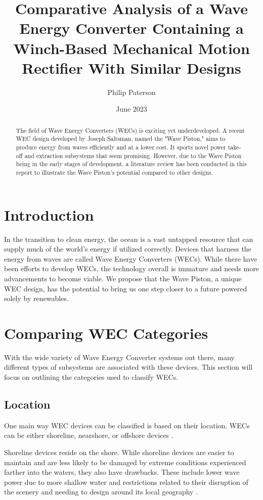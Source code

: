 \documentclass[journal]{IEEEtran}
\title{Comparative Analysis of a Wave Energy Converter Containing a Winch-Based Mechanical Motion Rectifier With Similar Designs}
\author{Philip Paterson}
\date{June 2023}
\begin{document}
\maketitle

\begin{abstract}
    The field of Wave Energy Converters (WECs) is exciting yet underdeveloped. A recent WEC design developed by Joseph Saltsman, named the "Wave Piston," aims to produce energy from waves efficiently and at a lower cost. It sports novel power take-off and extraction subsystems that seem promising. However, due to the Wave Piston being in the early stages of development, a literature review has been conducted in this report to illustrate the Wave Piston's potential compared to other designs.
\end{abstract}

\section{Introduction}
In the transition to clean energy, the ocean is a vast untapped resource that can supply much of the world's energy if utilized correctly. Devices that harness the energy from waves are called Wave Energy Converters (WECs). While there have been efforts to develop WECs, the technology overall is immature and needs more advancements to become viable. We propose that the Wave Piston, a unique WEC design, has the potential to bring us one step closer to a future powered solely by renewables.

\section{Comparing WEC Categories}
With the wide variety of Wave Energy Converter systems out there, many different types of subsystems are associated with these devices. This section will focus on outlining the categories used to classify WECs.

\subsection{Location}
    One main way WEC devices can be classified is based on their location. WECs can be either shoreline, nearshore, or offshore devices \cite{doi:10.1243/09576509JPE782}.
    
    Shoreline devices reside on the shore. While shoreline devices are easier to maintain and are less likely to be damaged by extreme conditions experienced farther into the waters, they also have drawbacks. These include lower wave power due to more shallow water and restrictions related to their disruption of the scenery and needing to design around its local geography \cite{doi:10.1243/09576509JPE782}.
    
\end{document}
